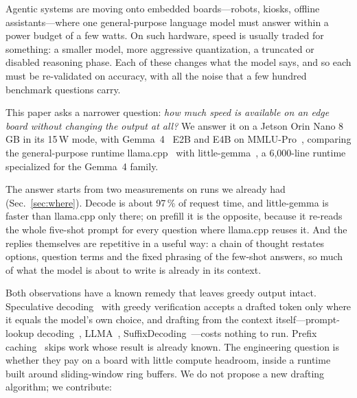 \documentclass[conference]{IEEEtran}
\newcommand{\lc}{llama.cpp}
\newcommand{\lgm}{little-gemma}
\begin{document}
Agentic systems are moving onto embedded boards---robots, kiosks, offline
assistants---where one general-purpose language model must answer within a
power budget of a few watts. On such hardware, speed is usually traded for
something: a smaller model, more aggressive quantization, a truncated or
disabled reasoning phase. Each of these changes what the model says, and so
each must be re-validated on accuracy, with all the noise that a few hundred
benchmark questions carry.

This paper asks a narrower question: \emph{how much speed is available on an
edge board without changing the output at all?} We answer it on a Jetson Orin
Nano 8\,GB in its 15\,W mode, with Gemma~4~\cite{gemma4} E2B and E4B on
MMLU-Pro~\cite{mmlupro}, comparing the general-purpose runtime \lc{}~\cite{llamacpp}
with \lgm{}~\cite{littlegemma,littlegemmarepo}, a 6,000-line runtime specialized for
the Gemma~4 family.

The answer starts from two measurements on runs we already had
(Sec.~\ref{sec:where}). Decode is about 97\,\% of request time, and \lgm{} is
faster than \lc{} only there; on prefill it is the opposite, because it
re-reads the whole five-shot prompt for every question where \lc{} reuses it.
And the replies themselves are repetitive in a useful way: a chain of thought
restates options, question terms and the fixed phrasing of the few-shot
answers, so much of what the model is about to write is already in its context.

Both observations have a known remedy that leaves greedy output intact.
Speculative decoding~\cite{leviathan2023,chen2023} with greedy verification
accepts a drafted token only where it equals the model's own choice, and
drafting from the context itself---prompt-lookup decoding~\cite{pld},
LLMA~\cite{llma}, SuffixDecoding~\cite{suffixdecoding}---costs nothing to run. Prefix caching~\cite{vllm,sglang}
skips work whose result is already known. The engineering question is whether
they pay on a board with little compute headroom, inside a runtime built around
sliding-window ring buffers. We do not propose a new drafting algorithm; we
contribute:
\end{document}
